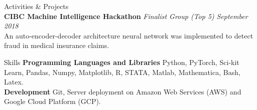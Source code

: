 \documentclass{resume} %
\begin{document}
\begin{rSection}{Activities \& Projects}
\\{\bf CIBC Machine Intelligence Hackathon} \emph{Finalist Group (Top 5)} \hfill \emph{September 2018}
\\
An auto-encoder-decoder architecture neural network was implemented to detect fraud in medical insurance claims.
\\

\end{rSection}

\begin{rSection}{Skills}
\textbf{Programming Languages and Libraries} Python, PyTorch, Sci-kit Learn, Pandas, Numpy, Matplotlib, R, STATA, Matlab, Mathematica, Bash, Latex.
\\\textbf{Development} Git, Server deployment on Amazon Web Services (AWS) and Google Cloud Platform (GCP).
\end{rSection}


\end{document}
